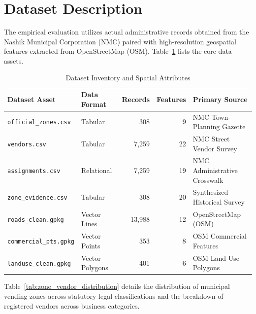 \section{Dataset Description}
\label{sec:dataset_description}

The empirical evaluation utilizes actual administrative records obtained from the Nashik Municipal Corporation (NMC) paired with high-resolution geospatial features extracted from OpenStreetMap (OSM). Table~\ref{tab:dataset_inventory} lists the core data assets.

\begin{table}[htbp]
\caption{Dataset Inventory and Spatial Attributes}
\label{tab:dataset_inventory}
\centering
\small
\begin{tabular}{llrrl}
\toprule
\textbf{Dataset Asset} & \textbf{Data Format} & \textbf{Records} & \textbf{Features} & \textbf{Primary Source} \\
\midrule
\texttt{official\_zones.csv} & Tabular & 308 & 9 & NMC Town-Planning Gazette \\
\texttt{vendors.csv} & Tabular & 7,259 & 22 & NMC Street Vendor Survey \\
\texttt{assignments.csv} & Relational & 7,259 & 19 & NMC Administrative Crosswalk \\
\texttt{zone\_evidence.csv} & Tabular & 308 & 20 & Synthesized Historical Survey \\
\texttt{roads\_clean.gpkg} & Vector Lines & 13,988 & 12 & OpenStreetMap (OSM) \\
\texttt{commercial\_pts.gpkg} & Vector Points & 353 & 8 & OSM Commercial Features \\
\texttt{landuse\_clean.gpkg} & Vector Polygons & 401 & 6 & OSM Land Use Polygons \\
\bottomrule
\end{tabular}
\end{table}

Table~\ref{tab:zone_vendor_distribution} details the distribution of municipal vending zones across statutory legal classifications and the breakdown of registered vendors across business categories.

